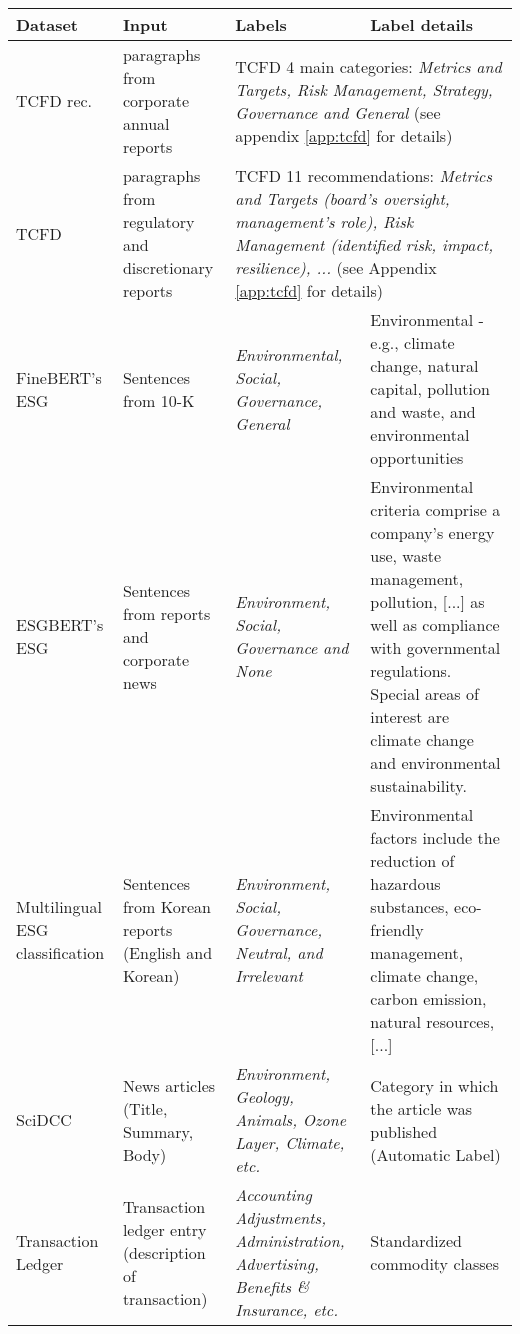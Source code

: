 \begin{table}[ht]
\centering
\begin{tabular}{p{3cm}p{3cm}p{3cm}p{5cm}}
\toprule
\textbf{Dataset} & \textbf{Input} & \textbf{Labels}                                                                                  & \textbf{Label details}                                          \\
\midrule
TCFD rec. \cite{bingler_cheap_2021} & paragraphs from corporate annual reports & \multicolumn{2}{p{8cm}}{TCFD 4 main categories: \textit{Metrics and Targets, Risk Management, Strategy, Governance and General} (see appendix \ref{app:tcfd} for details)}             \\
TCFD \cite{sampson_tcfd-nlp_nodate} & paragraphs from  regulatory and discretionary reports & \multicolumn{2}{p{8cm}}{TCFD 11 recommendations: \textit{Metrics and Targets (board’s oversight,  management’s role), Risk Management (identified risk, impact, resilience), ...} (see Appendix \ref{app:tcfd} for details)}             \\ 
\midrule
FineBERT's ESG \cite{huangFinBERTLargeLanguage2020} & Sentences from 10-K  & \textit{Environmental, Social, Governance, General} & Environmental - e.g., climate
change, natural capital, pollution and waste, and environmental opportunities \\
ESGBERT's ESG \cite{schimanski_bridging_2023} & Sentences from reports and corporate news & \textit{Environment, Social, Governance and None} & Environmental criteria comprise a
company’s energy use, waste management, pollution, [...]
as well as compliance with governmental regulations.
Special areas of interest are climate
change and environmental sustainability.  \\
Multilingual ESG classification \cite{LEE2023119726} & Sentences from Korean reports (English and Korean)  & \textit{Environment, Social,
Governance, Neutral, and Irrelevant} & Environmental factors include the reduction of hazardous substances, eco-friendly management, climate change, carbon emission, natural resources, [...] \\ 
\midrule
SciDCC \cite{mishra2021neuralnere} & News articles (Title, Summary, Body)  & \textit{Environment, Geology, Animals, Ozone Layer, Climate, etc.} & Category in which the article was published (Automatic Label)   \\
Transaction Ledger \cite{jain_supply_2023} & Transaction ledger entry (description of transaction) & \textit{Accounting Adjustments, Administration, Advertising, Benefits \& Insurance, etc.} & Standardized commodity classes  \\

\end{tabular}
\end{table}
